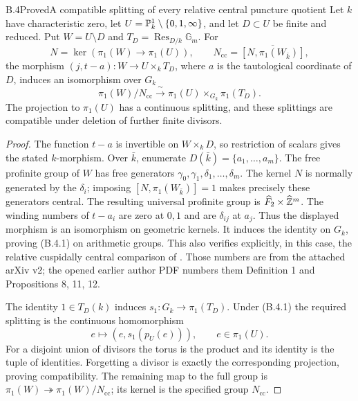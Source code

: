 \begin{statement}{B.4}{Proved}{A compatible splitting of every relative central puncture quotient}
Let $k$ have characteristic zero, let
$U=\mathbb P^1_k\setminus\{0,1,\infty\}$, and let $D\subset U$ be finite
and reduced.  Put $W=U\setminus D$ and
$T_D=\operatorname{Res}_{D/k}\mathbb G_m$.  For
\[
 N=\ker(\pi_1(W)\to\pi_1(U)),\qquad
 N_{\mathrm{cc}}=\overline{[N,\pi_1(W_{\bar k})]},
\]
the morphism $(j,t-a):W\to U\times_kT_D$, where $a$ is the
tautological coordinate of $D$, induces an isomorphism over $G_k$
\[
 \pi_1(W)/N_{\mathrm{cc}}
 \xrightarrow{\ \sim\ }
 \pi_1(U)\times_{G_k}\pi_1(T_D).                 \tag{B.4.1}
\]
The projection to $\pi_1(U)$ has a continuous splitting, and these
splittings are compatible under deletion of further finite divisors.
\end{statement}
\begin{proof}
The function $t-a$ is invertible on $W\times_kD$, so restriction of
scalars gives the stated $k$-morphism.  Over $\bar k$, enumerate
$D(\bar k)=\{a_1,\dots,a_m\}$.  The free profinite group of $W$
has free generators $\gamma_0,\gamma_1,\delta_1,\dots,\delta_m$.
The kernel $N$ is normally generated by the $\delta_i$; imposing
$[N,\pi_1(W_{\bar k})]=1$ makes precisely these generators central.
The resulting universal profinite group is
$\widehat F_2\times\widehat{\mathbb Z}^m$.
The winding numbers of $t-a_i$ are zero at $0,1$ and are
$\delta_{ij}$ at $a_j$.  Thus the displayed morphism is an isomorphism
on geometric kernels.  It induces the identity on $G_k$, proving
(B.4.1) on arithmetic groups.  This also verifies explicitly, in this
case, the relative cuspidally central comparison of
\cite[Definition 2.1 and Propositions 3.1, 3.4, 3.5]{BIR_BorneEmsalemStix2015}.
Those numbers are from the attached arXiv v2; the opened earlier
author PDF numbers them Definition 1 and Propositions 8, 11, 12.

The identity $1\in T_D(k)$ induces $s_1:G_k\to\pi_1(T_D)$.
Under (B.4.1) the required splitting is the continuous homomorphism
\[
 e\longmapsto(e,s_1(p_U(e))),\qquad e\in\pi_1(U).
\]
For a disjoint union of divisors the torus is the product and its
identity is the tuple of identities.  Forgetting a divisor is exactly
the corresponding projection, proving compatibility.
The remaining map to the full group is
$\pi_1(W)\twoheadrightarrow\pi_1(W)/N_{\mathrm{cc}}$; its kernel
is the specified group $N_{\mathrm{cc}}$.
\end{proof}

